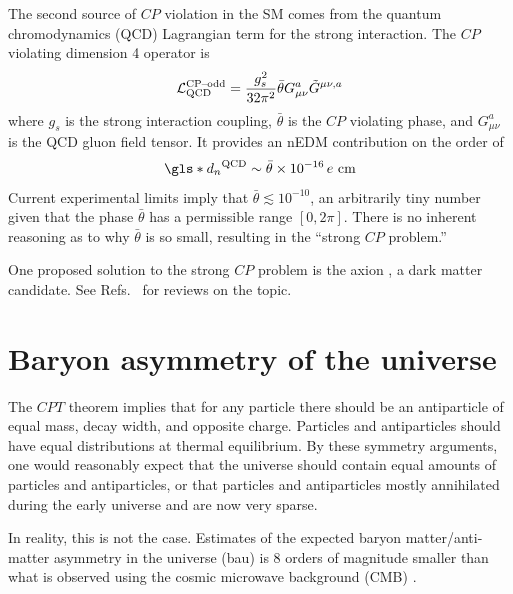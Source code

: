 The second source of $CP$ violation in the SM comes from the quantum chromodynamics (QCD) Lagrangian term for the strong interaction. The $CP$ violating dimension 4 operator is
%
\begin{gather}
    \mathcal{L}_\text{QCD}^\text{CP\textendash odd}=\frac{g^2_s}{32\pi^2}\bar{\theta}G^a_{\mu\nu}\tilde{G}^{\mu\nu, a}
\end{gather}
%
where $g_s$ is the strong interaction coupling, $\bar{\theta}$ is the $CP$ violating phase, and $G^a_{\mu\nu}$ is the QCD gluon field tensor. It provides an nEDM contribution on the order of \cite{cp_violation_wo_strangeness}
%
\begin{gather}
    \gls*{d_n}^\text{QCD}\sim \bar{\theta}\times 10^{-16}\,e\text{ cm}
\end{gather}
%
Current experimental limits imply that $\bar{\theta}\lesssim 10^{-10}$, an arbitrarily tiny number given that the phase $\bar{\theta}$ has a permissible range $[0, 2\pi]$. There is no inherent reasoning as to why $\bar{\theta}$ is so small, resulting in the ``strong $CP$ problem.''

One proposed solution to the strong $CP$ problem is the axion \cite{peccei_quinn_axion}, a dark matter candidate. See Refs.~\cite{BAER20151, kim_gianpaolo_2010} for reviews on the topic.


\section{Baryon asymmetry of the universe}


The $CPT$ theorem implies that for any particle there should be an antiparticle of equal mass, decay width, and opposite charge. Particles and antiparticles should have equal distributions at thermal equilibrium. By these symmetry arguments, one would reasonably expect that the universe should contain equal amounts of particles and antiparticles, or that particles and antiparticles mostly annihilated during the early universe and are now very sparse.

In reality, this is not the case. Estimates of the expected baryon matter/anti-matter asymmetry in the universe (\acrshort*{bau}) is 8 orders of magnitude smaller than what is observed using the cosmic microwave background (CMB) \cite{Mor13, Dubbers2011}.

